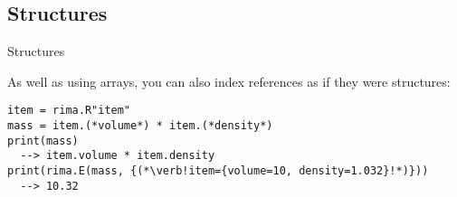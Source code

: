 \documentclass[smaller,handout]{beamer}
\begin{document}
\subsection{Structures}
\begin{frame}[fragile]{Structures}

  As well as using arrays, you can also index references as if they were structures:
  \begin{lstlisting}
item = rima.R"item"
mass = item.(*volume*) * item.(*density*)
print(mass)
  --> item.volume * item.density
print(rima.E(mass, {(*\verb!item={volume=10, density=1.032}!*)}))
  --> 10.32
  \end{lstlisting}

\end{frame}


\end{document}
